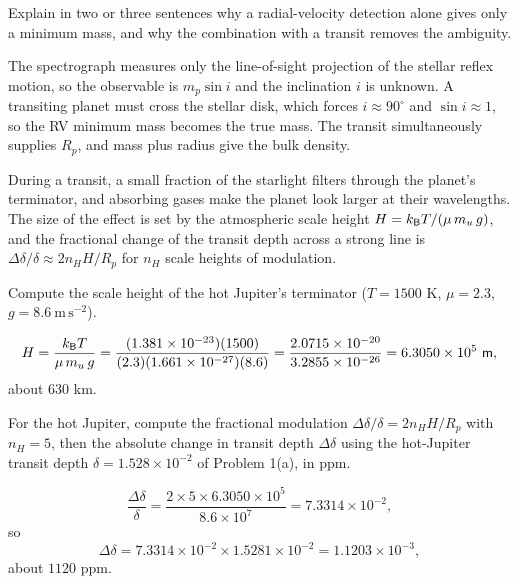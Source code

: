 \parti Explain in two or three sentences why a radial-velocity detection alone gives only a minimum mass, and why the combination with a transit removes the ambiguity.

\begin{solution}
The spectrograph measures only the line-of-sight projection of the stellar reflex motion, so the observable is $m_p \sin i$ and the inclination $i$ is unknown.
A transiting planet must cross the stellar disk, which forces $i \approx 90^\circ$ and $\sin i \approx 1$, so the RV minimum mass becomes the true mass.
The transit simultaneously supplies $R_p$, and mass plus radius give the bulk density.
\end{solution}



During a transit, a small fraction of the starlight filters through the planet's terminator, and absorbing gases make the planet look larger at their wavelengths.
The size of the effect is set by the atmospheric scale height $H = k_{\mathsf{B}} T/(\mu\,m_u\,g)$, and the fractional change of the transit depth across a strong line is $\Delta\delta/\delta \approx 2 n_H H/R_p$ for $n_H$ scale heights of modulation.

\parti Compute the scale height of the hot Jupiter's terminator ($T = 1500$ K, $\mu = 2.3$, $g = 8.6\ \mathrm{m\,s^{-2}}$).

\begin{solution}
\[
H = \frac{k_{\mathsf{B}} T}{\mu\,m_u\,g}
= \frac{(1.381\times10^{-23})(1500)}{(2.3)(1.661\times10^{-27})(8.6)}
= \frac{2.0715\times10^{-20}}{3.2855\times10^{-26}} = 6.3050\times10^{5}\ \mathsf{m},
\]
about $630$ km.
\end{solution}

\parti For the hot Jupiter, compute the fractional modulation $\Delta\delta/\delta = 2 n_H H/R_p$ with $n_H = 5$, then the absolute change in transit depth $\Delta\delta$ using the hot-Jupiter transit depth $\delta = 1.528 \times 10^{-2}$ of Problem 1(a), in ppm.

\begin{solution}
\[
\frac{\Delta\delta}{\delta} = \frac{2 \times 5 \times 6.3050\times10^{5}}{8.6\times10^{7}} = 7.3314\times10^{-2},
\]
so
\[
\Delta\delta = 7.3314\times10^{-2} \times 1.5281\times10^{-2} = 1.1203\times10^{-3},
\]
about $1120$ ppm.
\end{solution}

